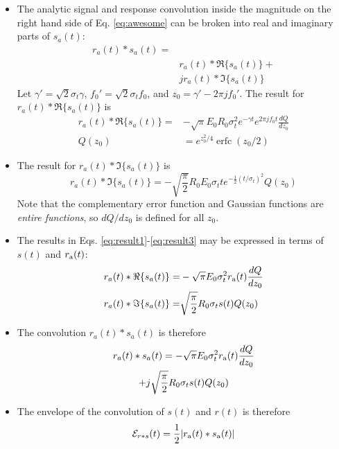 \documentclass[amsmath,amssymb,aps,prd,10pt,twocolumn,showkeys]{revtex4}
\DeclareMathOperator\erfc{erfc}
\begin{document}
\begin{itemize}
\item The analytic signal and response convolution inside the magnitude on the right hand side of Eq. \ref{eq:awesome} can be broken into real and imaginary parts of $s_a(t)$:
\begin{align}
r_a (t) * s_a(t) = & \\ 
& r_a(t) * \Re\lbrace s_a(t)\rbrace + \\ 
& j r_a(t) * \Im\lbrace s_a(t)\rbrace
\end{align}
Let $\gamma' = \sqrt{2}\sigma_t \gamma$, $f_0' = \sqrt{2} \sigma_t f_0$, and $z_0 = \gamma' - 2\pi j f_0'$.  The result for $r_a(t) * \Re\lbrace s_a(t)\rbrace$ is
\begin{align}
r_a(t) * \Re\lbrace s_a(t)\rbrace =& -\sqrt{\pi} E_0 R_0 \sigma_t^2 e^{-\gamma t} e^{2\pi j f_0 t} \frac{dQ}{dz_0} \label{eq:result1} \\
Q(z_0) &= e^{z_0^2/4} \erfc(z_0/2) \label{eq:result2}
\end{align}
\item The result for $r_a(t) * \Im\lbrace s_a(t)\rbrace$ is
\begin{equation}
r_a(t) * \Im\lbrace s_a(t)\rbrace = -\sqrt{\frac{\pi}{2}} R_0 E_0 \sigma_t t e^{-\frac{1}{2}(t/\sigma_t)^2} Q(z_0) \label{eq:result3}
\end{equation}
Note that the complementary error function and Gaussian functions are \textit{entire functions}, so $dQ/dz_0$ is defined for all $z_0$.
\item The results in Eqs. \ref{eq:result1}-\ref{eq:result3} may be expressed in terms of $s(t)$ and $r_{\rm a}(t)$:
\begin{align}
r_a(t) * \Re\lbrace s_a(t)\rbrace =& -\sqrt{\pi} E_0 \sigma_t^2 r_{\rm a}(t) \frac{dQ}{dz_0} \label{eq:Re} \\
r_a(t) * \Im\lbrace s_a(t)\rbrace =& \sqrt{\frac{\pi}{2}} R_0 \sigma_t s(t) Q(z_0) \label{eq:Im}
\end{align}
\item The convolution $r_a (t) * s_a(t)$ is therefore
\begin{multline}
r_a (t) * s_a(t) = -\sqrt{\pi} E_0 \sigma_t^2 r_{\rm a}(t) \frac{dQ}{dz_0} \\ + j\sqrt{\frac{\pi}{2}} R_0 \sigma_t s(t) Q(z_0)
\end{multline}
\item The envelope of the convolution of $s(t)$ and $r(t)$ is therefore
\begin{equation}
\mathcal{E}_{r * s}(t) = \frac{1}{2}|r_{\rm a}(t) * s_{\rm a}(t)|

\end{equation}
\end{itemize}
\end{document}
